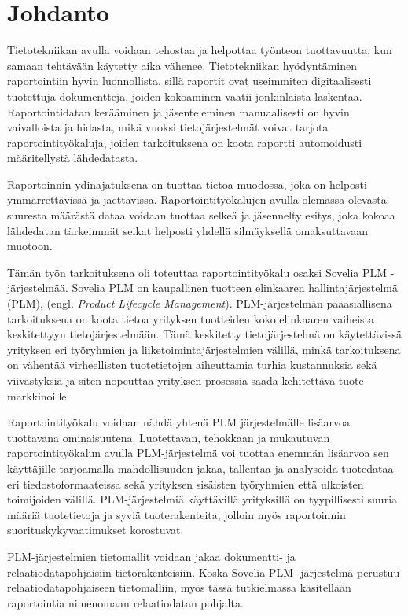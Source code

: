 \chapter{Johdanto} \label{Johdanto}

Tietotekniikan avulla voidaan tehostaa ja helpottaa työnteon tuottavuutta, kun samaan tehtävään käytetty aika vähenee. Tietotekniikan hyödyntäminen raportointiin hyvin luonnollista, sillä raportit ovat useimmiten digitaalisesti tuotettuja dokumentteja, joiden kokoaminen vaatii jonkinlaista laskentaa. Raportointidatan kerääminen ja jäsenteleminen manuaalisesti on hyvin vaivalloista ja hidasta, mikä vuoksi tietojärjestelmät voivat tarjota raportointityökaluja, joiden tarkoituksena on koota raportti automoidusti määritellystä lähdedatasta.

Raportoinnin ydinajatuksena on tuottaa tietoa muodossa, joka on helposti ymmärrettävissä ja jaettavissa. Raportointityökalujen avulla olemassa olevasta suuresta määrästä dataa voidaan tuottaa selkeä ja jäsennelty esitys, joka kokoaa lähdedatan tärkeimmät seikat helposti yhdellä silmäyksellä omaksuttavaan muotoon.

Tämän työn tarkoituksena oli toteuttaa raportointityökalu osaksi Sovelia PLM -järjestelmää. Sovelia PLM on kaupallinen tuotteen elinkaaren hallintajärjestelmä (PLM), (engl. \textit{Product Lifecycle Management}). PLM-järjestelmän pääasiallisena tarkoituksena on koota tietoa yrityksen tuotteiden koko elinkaaren vaiheista keskitettyyn tietojärjestelmään. Tämä keskitetty tietojärjestelmä on käytettävissä yrityksen eri työryhmien ja liiketoimintajärjestelmien välillä, minkä tarkoituksena on vähentää virheellisten tuotetietojen aiheuttamia turhia kustannuksia sekä viivästyksiä ja siten nopeuttaa yrityksen prosessia saada kehitettävä tuote markkinoille.

Raportointityökalu voidaan nähdä yhtenä PLM järjestelmälle lisäarvoa tuottavana ominaisuutena. Luotettavan, tehokkaan ja mukautuvan raportointityökalun avulla PLM-järjestelmä voi tuottaa enemmän lisäarvoa sen käyttäjille tarjoamalla mahdollisuuden jakaa, tallentaa ja analysoida tuotedataa eri tiedostoformaateissa sekä yrityksen sisäisten työryhmien että ulkoisten toimijoiden välillä. PLM-järjestelmiä käyttävillä yrityksillä on tyypillisesti suuria määriä tuotetietoja ja syviä tuoterakenteita, jolloin myös raportoinnin suorituskykyvaatimukset korostuvat.

PLM-järjestelmien tietomallit voidaan jakaa dokumentti- ja relaatiodatapohjaisiin tietorakenteisiin. \cite{david_what_2016} Koska Sovelia PLM -järjestelmä perustuu relaatiodatapohjaiseen tietomalliin, myös tässä tutkielmassa käsitellään raportointia nimenomaan relaatiodatan pohjalta.

